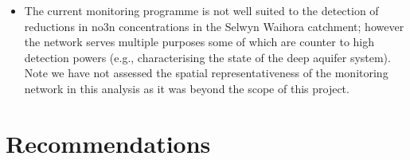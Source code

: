 \begin{itemize}
    \item The current monitoring programme is not well suited to the detection of reductions in \gls{no3n} concentrations in the Selwyn Waihora catchment; however the network serves multiple purposes some of which are counter to high detection powers (e.g., characterising the state of the deep aquifer system). Note we have not assessed the spatial representativeness of the monitoring network in this analysis as it was beyond the scope of this project.
\end{itemize}

\pagebreak
\section[Recommendations]{Recommendations} \label{sec:recommendations}


